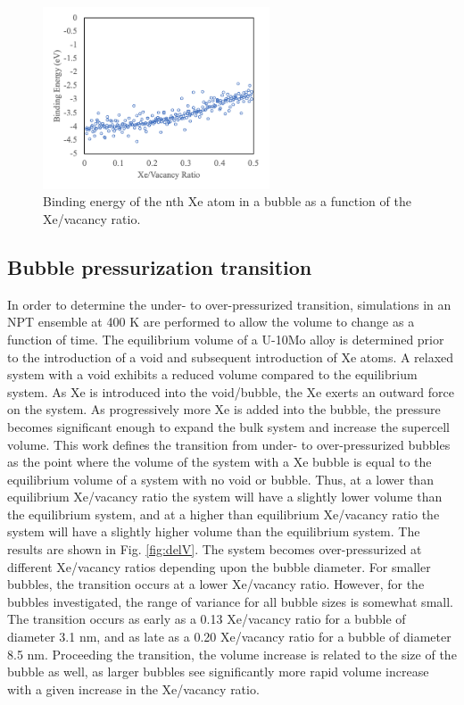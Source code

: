 \documentclass[review]{elsarticle}
\begin{document}
\begin{figure}[h]
 \centering
 \includegraphics[width=0.6\textwidth]{4_binding.png} 
 \caption{Binding energy of the nth Xe atom in a bubble as a function of the Xe/vacancy ratio.}
 \label{fig:binding}
\end{figure}

\FloatBarrier

\subsection{Bubble pressurization transition}

In order to determine the under- to over-pressurized transition, simulations in an NPT ensemble at 400 K are performed to allow the volume to change as a function of time. The equilibrium volume of a U-10Mo alloy is determined prior to the introduction of a void and subsequent introduction of Xe atoms. A relaxed system with a void exhibits a reduced volume compared to the equilibrium system. As Xe is introduced into the void/bubble, the Xe exerts an outward force on the system. As progressively more Xe is added into the bubble, the pressure becomes significant enough to expand the bulk system and increase the supercell volume. This work defines the transition from under- to over-pressurized bubbles as the point where the volume of the system with a Xe bubble is equal to the equilibrium volume of a system with no void or bubble. Thus, at a lower than equilibrium Xe/vacancy ratio the system will have a slightly lower volume than the equilibrium system, and at a higher than equilibrium Xe/vacancy ratio the system will have a slightly higher volume than the equilibrium system. The results are shown in Fig. \ref{fig:delV}. The system becomes over-pressurized at different Xe/vacancy ratios depending upon the bubble diameter. For smaller bubbles, the transition occurs at a lower Xe/vacancy ratio. However, for the bubbles investigated, the range of variance for all bubble sizes is somewhat small. The transition occurs as early as a 0.13 Xe/vacancy ratio for a bubble of diameter 3.1 nm, and as late as a 0.20 Xe/vacancy ratio for a bubble of diameter 8.5 nm. Proceeding the transition, the volume increase is related to the size of the bubble as well, as larger bubbles see significantly more rapid volume increase with a given increase in the Xe/vacancy ratio. 
\end{document}
